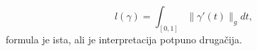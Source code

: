 \documentclass[preview]{standalone}
\begin{document}
\begin{center}
\[l(\gamma) = \int_{[0,1]} \lVert \gamma'(t)\rVert_g dt,\]
        formula je ista, ali je interpretacija potpuno drugačija.
\end{center}
\end{document}
